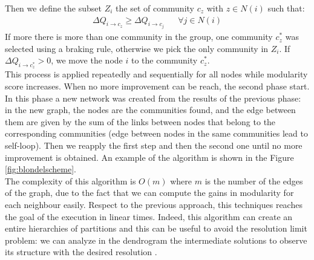 Then we define the subset $Z_i$ the set of community $c_z$ with $z \in N(i)$ such that:
\begin{align}
\Delta Q_{i \rightarrow c_z} \geq \Delta Q_{i \rightarrow c_j} && \forall j \in N(i)
\end{align}
If more there is more than one community in the group, one community $c_z^*$ was selected using a braking rule, otherwise we pick the only community in $Z_i$. If $\Delta Q_{i \rightarrow c_z^*} > 0$, we move the node $i$ to the community $c_z^*$. \\
This process is applied repeatedly and sequentially for all nodes while modularity score increases. When no more improvement can be reach, the second phase start. In this phase a new network was created from the results of the previous phase: in the new graph, the nodes are the communities found, and the edge between them are given by the sum of the links between nodes that belong to the corresponding communities (edge between nodes in the same communities lead to self-loop). Then we reapply the first step and then the second one until no more improvement is obtained. An example of the algorithm is shown in the Figure \ref{fig:blondelscheme}. \\
The complexity of this algorithm is $O(m)$ where $m$ is the number of the edges of the graph, due to the fact that we can compute the
gains in modularity for each neighbour easily. Respect to the previous approach, this techniques reaches the goal of the execution in linear times. Indeed, this algorithm can create an entire hierarchies of partitions and this can be useful to avoid the resolution limit problem: we can analyze in the dendrogram the intermediate solutions to observe its structure with the desired resolution \cite{Blondel_2008}.
